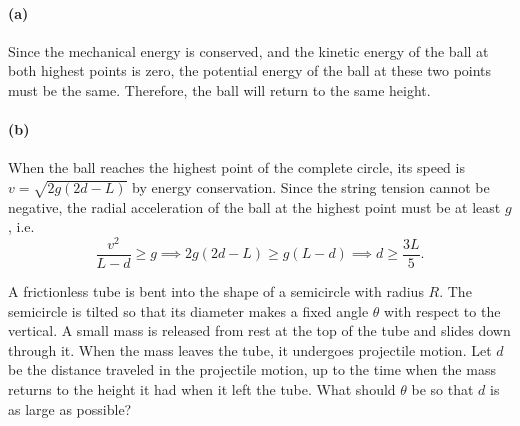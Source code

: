 \documentclass{article}
\begin{document}
\begin{solution}
	\paragraph{(a)} Since the mechanical energy is conserved, and the kinetic energy of the ball at both highest points is zero, the potential energy of the ball at these two points must be the same. Therefore, the ball will return to the same height.

	\paragraph{(b)} When the ball reaches the highest point of the complete circle, its speed is $v=\sqrt{2g(2d-L)}$ by energy conservation. Since the string tension cannot be negative, the radial acceleration of the ball at the highest point must be at least $g$, i.e.
	\[ \frac{v^2}{L-d}\ge g \implies 2g(2d-L)\ge g(L-d) \implies d\ge\frac{3L}{5}. \]
\end{solution}



\begin{problem}
A frictionless tube is bent into the shape of a semicircle with radius $R$. The semicircle is tilted so that its diameter makes a fixed angle $\theta$ with respect to the vertical. A small mass is released from rest at the top of the tube and slides down through it. When the mass leaves the tube, it undergoes projectile motion. Let $d$ be the distance traveled in the projectile motion, up to the time when the mass returns to the height it had when it left the tube. What should $\theta$ be so that $d$ is as large as possible?

\begin{center}
\end{center}
\end{problem}
\end{document}
